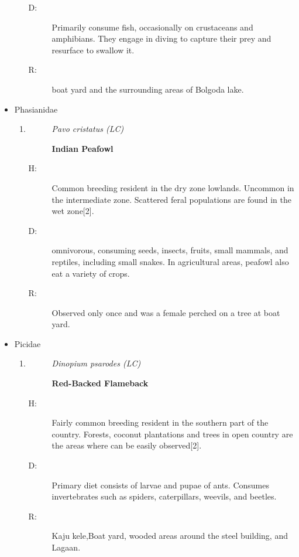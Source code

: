\begin{itemize}
\begin{enumerate}
\begin{description}
\item[D: ]%
Primarily consume fish, occasionally on crustaceans and amphibians. They engage in diving to capture their prey and resurface to swallow it.%
\item[R: ]%
boat yard and the surrounding areas of Bolgoda lake.%
\end{description}%
\end{enumerate}%
\item%
Phasianidae%
\begin{enumerate}%
\item%
\begin{description}%
\item[]%
\textit{Pavo cristatus (LC)}%
\item[]%
\textbf{Indian Peafowl}%
\end{description}%
\begin{description}%
\item[H: ]%
Common breeding resident in the dry zone lowlands. Uncommon in the intermediate zone. Scattered feral populations are found in the wet zone{[}2{]}.%
\item[D: ]%
omnivorous, consuming seeds, insects, fruits, small mammals, and reptiles, including small snakes. In agricultural areas, peafowl also eat a variety of crops.%
\item[R: ]%
Observed only once and was a female perched on a tree at boat yard.%
\end{description}%
\end{enumerate}%
\item%
Picidae%
\begin{enumerate}%
\item%
\begin{description}%
\item[]%
\textit{Dinopium psarodes (LC)}%
\item[]%
\textbf{Red{-}Backed Flameback}%
\end{description}%
\begin{description}%
\item[H: ]%
Fairly common breeding resident in the southern part of the country. Forests, coconut plantations and trees in open country are the areas where can be easily observed{[}2{]}.%
\item[D: ]%
Primary diet consists of larvae and pupae of ants. Consumes invertebrates such as spiders, caterpillars, weevils, and beetles.%
\item[R: ]%
Kaju kele,Boat yard, wooded areas around the steel building, and Lagaan.%

\end{description}
\end{enumerate}
\end{itemize}
